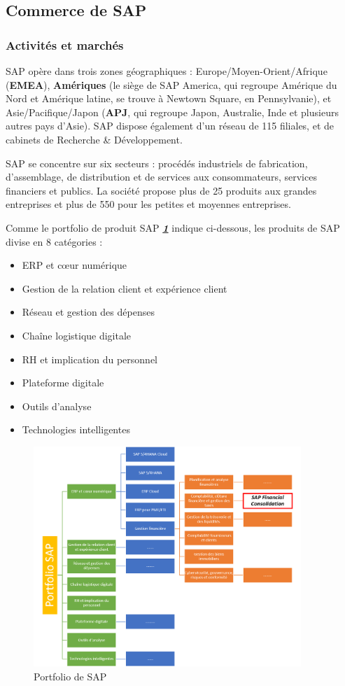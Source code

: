\subsection{Commerce de SAP} 
\subsubsection{Activités et marchés}
\cite{SAP-entreprise_wikipedia}SAP opère dans trois zones géographiques : Europe/Moyen-Orient/Afrique (\textbf{EMEA}), \textbf{Amériques} (le siège de SAP America, qui regroupe Amérique du Nord et Amérique latine, se trouve à Newtown Square, en Pennsylvanie), et Asie/Pacifique/Japon (\textbf{APJ}, qui regroupe Japon, Australie, Inde et plusieurs autres pays d’Asie). SAP dispose également d’un réseau de 115 filiales, et de cabinets de Recherche \& Développement.

SAP se concentre sur six secteurs : procédés industriels de fabrication, d’assemblage, de distribution et de services aux consommateurs, services financiers et publics. La société propose plus de 25 produits aux grandes entreprises et plus de 550 pour les petites et moyennes entreprises.

\par Comme le portfolio de produit SAP \textbf{\textit{\ref{fig:portfolioSAP_label}}} indique ci-dessous, les produits de SAP divise en 8 catégories : 
\begin{itemize}
	\item ERP et cœur numérique
	\item Gestion de la relation client et expérience client
	\item Réseau et gestion des dépenses
	\item Chaîne logistique digitale
	\item RH et implication du personnel
	\item Plateforme digitale
	\item Outils d'analyse
	\item Technologies intelligentes
\end{itemize} 

\begin{figure}[H]
	\centering
	\includegraphics[width=0.9\textwidth]{images/SAP_portfolio.png}
	\caption{Portfolio de SAP}
	\label{fig:portfolioSAP_label}
\end{figure}


